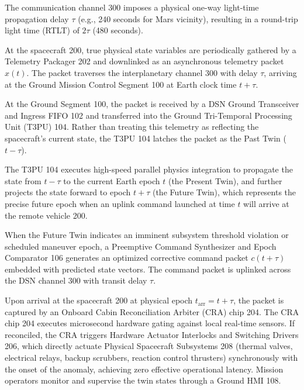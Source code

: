 \documentclass[12pt,a4paper]{article}
\begin{document}
The communication channel 300 imposes a physical one-way light-time propagation delay $\tau$ (e.g., 240 seconds for Mars vicinity), resulting in a round-trip light time (RTLT) of $2\tau$ (480 seconds). 

At the spacecraft 200, true physical state variables are periodically gathered by a Telemetry Packager 202 and downlinked as an asynchronous telemetry packet $x(t)$. The packet traverses the interplanetary channel 300 with delay $\tau$, arriving at the Ground Mission Control Segment 100 at Earth clock time $t + \tau$.

At the Ground Segment 100, the packet is received by a DSN Ground Transceiver and Ingress FIFO 102 and transferred into the Ground Tri-Temporal Processing Unit (T3PU) 104. Rather than treating this telemetry as reflecting the spacecraft's current state, the T3PU 104 latches the packet as the Past Twin ($t-\tau$). 

The T3PU 104 executes high-speed parallel physics integration to propagate the state from $t-\tau$ to the current Earth epoch $t$ (the Present Twin), and further projects the state forward to epoch $t + \tau$ (the Future Twin), which represents the precise future epoch when an uplink command launched at time $t$ will arrive at the remote vehicle 200.

When the Future Twin indicates an imminent subsystem threshold violation or scheduled maneuver epoch, a Preemptive Command Synthesizer and Epoch Comparator 106 generates an optimized corrective command packet $c(t+\tau)$ embedded with predicted state vectors. The command packet is uplinked across the DSN channel 300 with transit delay $\tau$.

Upon arrival at the spacecraft 200 at physical epoch $t_{\text{arr}} = t + \tau$, the packet is captured by an Onboard Cabin Reconciliation Arbiter (CRA) chip 204. The CRA chip 204 executes microsecond hardware gating against local real-time sensors. If reconciled, the CRA triggers Hardware Actuator Interlocks and Switching Drivers 206, which directly actuate Physical Spacecraft Subsystems 208 (thermal valves, electrical relays, backup scrubbers, reaction control thrusters) synchronously with the onset of the anomaly, achieving zero effective operational latency. Mission operators monitor and supervise the twin states through a Ground HMI 108.
\end{document}
